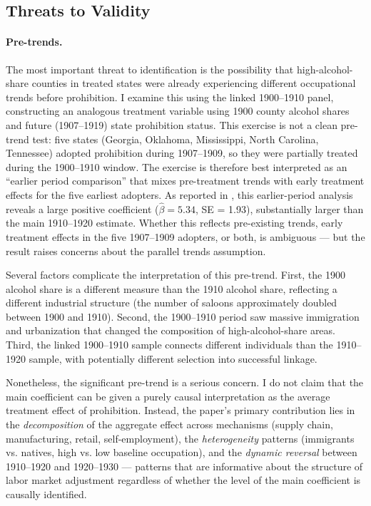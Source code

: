 \documentclass[12pt]{article}
\begin{document}
\subsection{Threats to Validity}
\label{sec:threats}

\paragraph{Pre-trends.} The most important threat to identification is the possibility that high-alcohol-share counties in treated states were already experiencing different occupational trends before prohibition. I examine this using the linked 1900--1910 panel, constructing an analogous treatment variable using 1900 county alcohol shares and future (1907--1919) state prohibition status. This exercise is not a clean pre-trend test: five states (Georgia, Oklahoma, Mississippi, North Carolina, Tennessee) adopted prohibition during 1907--1909, so they were partially treated during the 1900--1910 window. The exercise is therefore best interpreted as an ``earlier period comparison'' that mixes pre-treatment trends with early treatment effects for the five earliest adopters. As reported in , this earlier-period analysis reveals a large positive coefficient ($\hat{\beta} = 5.34$, SE = 1.93), substantially larger than the main 1910--1920 estimate. Whether this reflects pre-existing trends, early treatment effects in the five 1907--1909 adopters, or both, is ambiguous --- but the result raises concerns about the parallel trends assumption.

Several factors complicate the interpretation of this pre-trend. First, the 1900 alcohol share is a different measure than the 1910 alcohol share, reflecting a different industrial structure (the number of saloons approximately doubled between 1900 and 1910). Second, the 1900--1910 period saw massive immigration and urbanization that changed the composition of high-alcohol-share areas. Third, the linked 1900--1910 sample connects different individuals than the 1910--1920 sample, with potentially different selection into successful linkage.

Nonetheless, the significant pre-trend is a serious concern. I do not claim that the main coefficient can be given a purely causal interpretation as the average treatment effect of prohibition. Instead, the paper's primary contribution lies in the \emph{decomposition} of the aggregate effect across mechanisms (supply chain, manufacturing, retail, self-employment), the \emph{heterogeneity} patterns (immigrants vs. natives, high vs. low baseline occupation), and the \emph{dynamic reversal} between 1910--1920 and 1920--1930 --- patterns that are informative about the structure of labor market adjustment regardless of whether the level of the main coefficient is causally identified.
\end{document}
